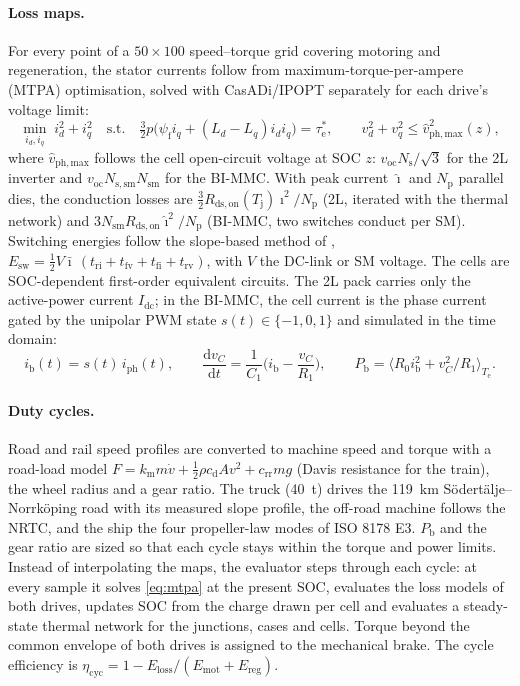 \documentclass{PCIM-Abstract}
\begin{document}
\paragraph{Loss maps.} For every point of a $50\times100$ speed--torque grid covering motoring and regeneration, the stator currents follow from maximum-torque-per-ampere (MTPA) optimisation, solved with CasADi/IPOPT \cite{andersson2019} separately for each drive's voltage limit:
\begin{equation}
\min_{i_d,i_q}\; i_d^2+i_q^2 \quad \text{s.t.}\quad \tfrac{3}{2}p\big(\psi_\mathrm{f} i_q + (L_d-L_q) i_d i_q\big)=\tau_\mathrm{e}^*,\qquad v_d^2+v_q^2 \le \hat v_\mathrm{ph,max}^2(z),
\label{eq:mtpa}
\end{equation}
where $\hat v_\mathrm{ph,max}$ follows the cell open-circuit voltage at SOC $z$: $v_\mathrm{oc}N_\mathrm{s}/\sqrt3$ for the 2L inverter and $v_\mathrm{oc}N_\mathrm{s,sm}N_\mathrm{sm}$ for the BI-MMC. With peak current $\hat\imath$ and $N_\mathrm{p}$ parallel dies, the conduction losses are $\tfrac{3}{2}R_\mathrm{ds,on}(T_\mathrm{j})\hat\imath^2/N_\mathrm{p}$ (2L, iterated with the thermal network) and $3N_\mathrm{sm}R_\mathrm{ds,on}\hat\imath^2/N_\mathrm{p}$ (BI-MMC, two switches conduct per SM). Switching energies follow the slope-based method of \cite{graovac2006}, $E_\mathrm{sw}=\tfrac{1}{2}V\bar\imath\,(t_\mathrm{ri}+t_\mathrm{fv}+t_\mathrm{fi}+t_\mathrm{rv})$, with $V$ the DC-link or SM voltage. The cells are SOC-dependent first-order equivalent circuits. The 2L pack carries only the active-power current $I_\mathrm{dc}$; in the BI-MMC, the cell current is the phase current gated by the unipolar PWM state $s(t)\in\{-1,0,1\}$ and simulated in the time domain:
\begin{equation}
i_\mathrm{b}(t)=s(t)\,i_\mathrm{ph}(t),\qquad \frac{\mathrm{d}v_{C}}{\mathrm{d}t}=\frac{1}{C_1}\Big(i_\mathrm{b}-\frac{v_C}{R_1}\Big),\qquad P_\mathrm{b}=\big\langle R_0 i_\mathrm{b}^2+v_C^2/R_1\big\rangle_{T_\mathrm{e}} .
\label{eq:batt}
\end{equation}

\paragraph{Duty cycles.} Road and rail speed profiles are converted to machine speed and torque with a road-load model $F=k_\mathrm{m}m\dot v+\tfrac12\rho c_\mathrm{d}Av^2+c_\mathrm{rr}mg$ (Davis resistance for the train), the wheel radius and a gear ratio. The truck (\SI{40}{\tonne}) drives the \SI{119}{\kilo\metre} Södertälje--Norrköping road with its measured slope profile, the off-road machine follows the NRTC, and the ship the four propeller-law modes of ISO 8178 E3. $P_\mathrm{b}$ and the gear ratio are sized so that each cycle stays within the torque and power limits. Instead of interpolating the maps, the evaluator steps through each cycle: at every sample it solves \cref{eq:mtpa} at the present SOC, evaluates the loss models of both drives, updates SOC from the charge drawn per cell and evaluates a steady-state thermal network for the junctions, cases and cells. Torque beyond the common envelope of both drives is assigned to the mechanical brake. The cycle efficiency is $\eta_\mathrm{cyc}=1-E_\mathrm{loss}/(E_\mathrm{mot}+E_\mathrm{reg})$.
\end{document}
